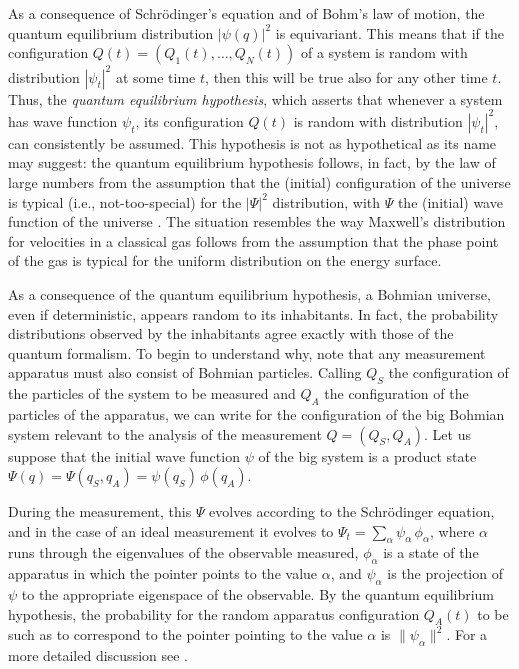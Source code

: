 \documentclass[12pt]{article}
\begin{document}
As a consequence of Schr\"odinger's equation and of Bohm's law of motion, 
the quantum equilibrium distribution $|\psi(q)|^2$ is equivariant.  This means that if the configuration $Q(t) = (Q_1(t), \ldots, Q_N(t))$ of a system is random with distribution $|\psi_t|^2$ at some time $t$, then this will be true also for any other time $t$. Thus, the \emph{quantum equilibrium hypothesis}, which asserts that whenever a system has wave function $\psi_t$, its configuration $Q(t)$ is random with distribution $|\psi_t|^2$, can consistently be assumed. This hypothesis is not as hypothetical as its name may suggest: the quantum equilibrium hypothesis follows, in fact, by the law of large numbers from the assumption that the (initial) configuration of the universe is typical (i.e., not-too-special) for the $|\Psi|^2$ distribution, with $\Psi$ the (initial) wave function of the universe \citep{DGZ92}. The situation resembles the way Maxwell's distribution for velocities in a classical  
gas follows from the assumption that the phase point of the gas is typical for the uniform distribution on the energy surface.

As a consequence of the quantum equilibrium hypothesis, a Bohmian universe, even if deterministic, appears random to its inhabitants. In fact, the probability distributions observed by the inhabitants agree exactly with those of the quantum formalism. To begin to understand why, note that any measurement apparatus must also consist of Bohmian particles. Calling $Q_{S}$ the configuration of the particles of the system to be measured and $Q_{A}$ the configuration of 
the particles of the apparatus,
we can write for the configuration of the big Bohmian system relevant to the analysis of the measurement $Q=(Q_{S},Q_{A})$.  Let us suppose that the initial wave function $\psi$ of the big system is a product state  $\Psi(q)=\Psi(q_{S},q_{A})= \psi(q_{S}) \, \phi(q_{A})$. 

During the measurement, this $\Psi$ evolves according to the Schr\"odinger equation, and in the case of an ideal measurement it evolves to $\Psi_t = \sum_\alpha \psi_\alpha \, \phi_\alpha$, where $\alpha$ runs through the eigenvalues of the observable measured, $\phi_\alpha$ is a state of the apparatus in which the pointer points to the value $\alpha$, and $\psi_\alpha$ is the projection of $\psi$ to the appropriate eigenspace of the observable. By the quantum equilibrium hypothesis, the probability for the random apparatus configuration $Q_A(t)$ to be such as to correspond to the pointer pointing to the value $\alpha$ is $\|\psi_\alpha\|^2$. For a more detailed discussion see \citep{DGZ92,DGZ04}. 
\end{document}

